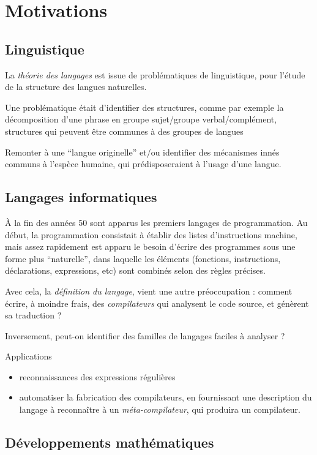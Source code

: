\documentclass[10pt,twoside]{article}
\begin{document}
\section{Motivations}

\subsection{Linguistique}

La \emph{théorie des langages} est issue de problématiques
de linguistique, pour l'étude de la structure des langues naturelles.

Une problématique était d'identifier des structures, comme par exemple
la décomposition d'une phrase en groupe sujet/groupe verbal/complément,
structures qui peuvent être communes à des groupes de langues

Remonter à une ``langue originelle'' et/ou identifier des mécanismes innés
communs à l'espèce humaine, qui prédisposeraient à l'usage d'une langue.


\subsection{Langages informatiques}

À la fin des années 50 sont apparus les premiers langages de
programmation. Au début, la programmation consistait à établir des
listes d'instructions machine, mais assez rapidement est apparu le
besoin d'écrire des programmes sous une forme plus ``naturelle'', dans
laquelle les éléments (fonctions, instructions, déclarations,
expressions, etc) sont combinés selon des règles précises.

Avec cela, la \emph{définition du langage}, vient une autre
préoccupation : comment écrire, à moindre frais, des
\emph{compilateurs} qui analysent le code source, et génèrent sa
traduction ?


Inversement, peut-on identifier des familles de langages faciles à
analyser ?

Applications
\begin{itemize}
\item reconnaissances des expressions régulières
\item automatiser la fabrication des compilateurs, en fournissant une
description du langage à reconnaître à un \emph{méta-compilateur}, qui 
produira un compilateur.
\end{itemize}

\subsection{Développements mathématiques}
\end{document}
